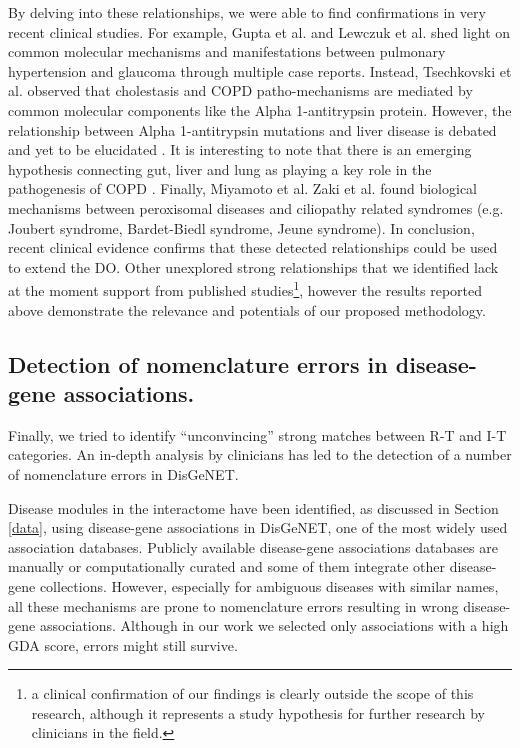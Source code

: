 \documentclass[journal,twoside,web]{ieeecolor}
\begin{document}
 By delving into these  relationships, we were able to find confirmations in very recent clinical studies. 
For example, Gupta et al. \cite{gupta2020secondary} and Lewczuk et al. \cite{lewczuk2019ocular} shed light on common molecular mechanisms and manifestations between pulmonary hypertension and glaucoma through multiple case reports. Instead, Tsechkovski et al.  \cite{tsechkovski1997a1} observed that cholestasis and COPD patho-mechanisms are mediated by common molecular components like the Alpha 1-antitrypsin protein. However, the relationship between Alpha 1-antitrypsin mutations and liver disease is debated and yet to be elucidated \cite{schneider2020liver}. It is interesting to note that there is an emerging hypothesis connecting gut, liver and lung as playing a key role in the pathogenesis of COPD  \cite{young2016gut}. Finally, Miyamoto et al.  Zaki et al. \cite{zaki2016pex6} found biological mechanisms between peroxisomal diseases and ciliopathy related syndromes (e.g. Joubert syndrome, Bardet-Biedl syndrome, Jeune syndrome).  
In conclusion, recent clinical evidence confirms that these detected relationships could be used to extend the DO.
Other unexplored strong relationships that we identified lack at the moment support from published studies\footnote{a clinical confirmation of our findings is clearly outside the scope of this research, although it represents a study hypothesis for further research by clinicians in the field.}, however the results reported above demonstrate the relevance and potentials of our proposed methodology.
\vspace{-9pt}


\subsection{Detection of nomenclature errors in disease-gene associations.}
\label{sec:nomenclature}

Finally,  we tried  to identify  ``unconvincing'' strong matches between R-T and I-T categories.
An in-depth analysis  by clinicians has led to the detection of a number of nomenclature errors in DisGeNET.

Disease modules in the interactome have been identified, as discussed in Section \ref{data}, using disease-gene associations in DisGeNET, one of the most widely used association databases. Publicly available disease-gene associations databases are manually or computationally curated and some of them integrate other disease-gene collections. However,  especially for ambiguous diseases with similar names, all these mechanisms are prone to nomenclature errors resulting in wrong  disease-gene associations.  Although in our work we selected only associations with a high GDA score,  errors might still survive.
\end{document}
